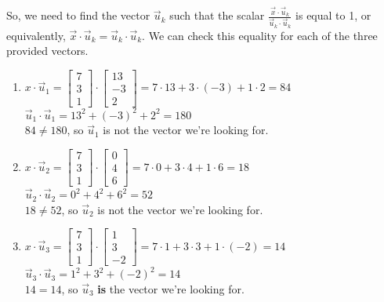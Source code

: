 \documentclass[11pt]{article}
\begin{document}
\begin{prob}
\begin{subprob}
\begin{solution}
So, we need to find the vector $\vec u_k$ such that the scalar $\frac{\vec x \cdot \vec u_k}{\vec u_k \cdot \vec u_k}$ is equal to 1, or equivalently, $\vec x \cdot \vec u_k = \vec u_k \cdot \vec u_k$. We can check this equality for each of the three provided vectors.
\begin{enumerate}
  \item $x \cdot \vec u_1 = \begin{bmatrix} 7 \\ 3 \\ 1 \end{bmatrix} \cdot \begin{bmatrix} 13 \\ -3 \\ 2 \end{bmatrix} = 7 \cdot 13 + 3 \cdot (-3) + 1 \cdot 2 = 84$ \\ $\vec u_1 \cdot \vec u_1 = 13^2 + (-3)^2 + 2^2 = 180$ \\ $84 \neq 180$, so $\vec u_1$ is not the vector we're looking for.
  \item $x \cdot \vec u_2 = \begin{bmatrix} 7 \\ 3 \\ 1 \end{bmatrix} \cdot \begin{bmatrix} 0 \\ 4 \\ 6 \end{bmatrix} = 7 \cdot 0 + 3 \cdot 4 + 1 \cdot 6 = 18$ \\ $\vec u_2 \cdot \vec u_2 = 0^2 + 4^2 + 6^2 = 52$ \\ $18 \neq 52$, so $\vec u_2$ is not the vector we're looking for.
  \item $x \cdot \vec u_3 = \begin{bmatrix} 7 \\ 3 \\ 1 \end{bmatrix} \cdot \begin{bmatrix} 1 \\ 3 \\ -2 \end{bmatrix} = 7 \cdot 1 + 3 \cdot 3 + 1 \cdot (-2) = 14$ \\ $\vec u_3 \cdot \vec u_3 = 1^2 + 3^2 + (-2)^2 = 14$ \\ $14 = 14$, so $\vec u_3$ \textbf{is} the vector we're looking for.
\end{enumerate}


\end{solution}
  
\emptybox{11cm}
  
\end{subprob}
  

\end{prob}
\end{document}
